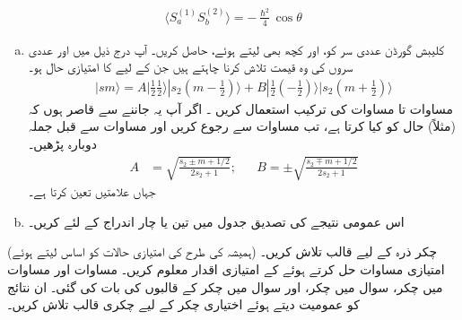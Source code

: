 \begin{align}
    \langle S_{a}^{(1)}S_{b}^{(2)}\rangle=-\frac{\hslash^{2}}{4}\cos\theta
\end{align}
\begin{enumerate}[a.]
\item    
 کلیبش گورڈن عددی سر   کو،   اور   کچھ بھی لیتے ہوئے،  حاصل کریں۔  آپ درج ذیل میں  اور  عددی سروں کی وہ قیمت تلاش کرنا چاہتے ہیں جن کے لیے    کا امتیازی حال     ہو۔ 
\begin{align*}
    |sm \rangle=A|\tfrac{1}{2}\tfrac{1}{2}\rangle|s_2(m-\tfrac{1}{2})\rangle+B|\tfrac{1}{2}(-\tfrac{1}{2})\rangle|s_2(m+\tfrac{1}{2})\rangle
\end{align*} 
مساوات  تا مساوات   کی ترکیب استعمال کریں ۔ اگر آپ یہ جاننے سے قاصر ہوں
 کہ  (مثلاً)    حال   کو کیا کرتا ہے، تب  مساوات    سے رجوع کریں اور مساوات   سے قبل جملہ دوبارہ پڑھیں۔ 
\begin{align*}
    A&=\sqrt{\frac{s_2\pm m+1/2}{2s_2+1}}; && B=\pm \sqrt{\frac{s_2\mp m+1/2}{2s_2+1}} 
\end{align*}
جہاں    علامتیں تعین کرتا ہے۔
\item 
اس عمومی نتیجے کی تصدیق جدول   میں تین یا چار اندراج   کے لئے  کریں۔
\end{enumerate}
(ہمیشہ کی طرح  کی امتیازی حالات کو اساس لیتے ہوئے)     چکر   ذرہ  کے لیے قالب  تلاش کریں۔ امتیازی مساوات حل کرتے ہوئے  کے  امتیازی اقدار معلوم کریں۔
مساوات    اور مساوات   میں  چکر،   سوال   میں  چکر،  اور سوال   میں  چکر کے قالبوں کی بات کی گئی۔ ان نتائج کو عمومیت دیتے ہوئے اختیاری  چکر کے لیے چکری قالب تلاش کریں۔
